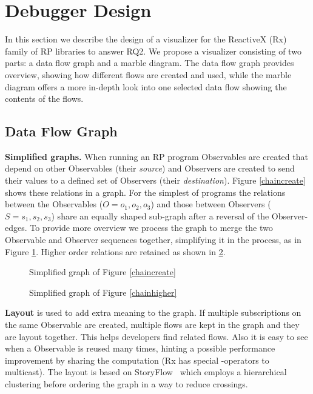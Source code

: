 \section{Debugger Design}
In this section we describe the design of a visualizer for the ReactiveX (Rx) family of RP libraries to answer RQ2. We propose a visualizer consisting of two parts: a data flow graph and a marble diagram. The data flow graph provides overview, showing how different flows are created and used, while the marble diagram offers a more in-depth look into one selected data flow showing the contents of the flows.

\subsection{Data Flow Graph}
\textbf{Simplified graphs.} When running an RP program Observables are created that depend on other Observables (their \textit{source}) and Observers are created to send their values to a defined set of Observers (their \textit{destination}). Figure \ref{chaincreate} shows these relations in a graph. For the simplest of programs the relations between the Observables ($O = {o_1, o_2, o_3}$) and those between Observers ($S = {s_1, s_2, s_3}$) share an equally shaped sub-graph after a reversal of the Observer-edges. To provide more overview we process the graph to merge the two Observable and Observer sequences together, simplifying it in the process, as in Figure \ref{fiddlesimple}. Higher order relations are retained as shown in \ref{fiddlehigher}.

\begin{figure}
	\centering
	
	\caption{Simplified graph of Figure \ref{chaincreate}}
	\label{fiddlesimple}
\end{figure}

\begin{figure}
	\centering
	
	\caption{Simplified graph of Figure \ref{chainhigher}}
	\label{fiddlehigher}
\end{figure}

\textbf{Layout} is used to add extra meaning to the graph. If multiple subscriptions on the same Observable are created, multiple flows are kept in the graph and they are layout together. This helps developers find related flows. Also it is easy to see when a Observable is reused many times, hinting a possible performance improvement by sharing the computation (Rx has special -operators to multicast). The layout is based on StoryFlow~\cite{liu2013storyflow} which employs a hierarchical clustering before ordering the graph in a way to reduce crossings.

